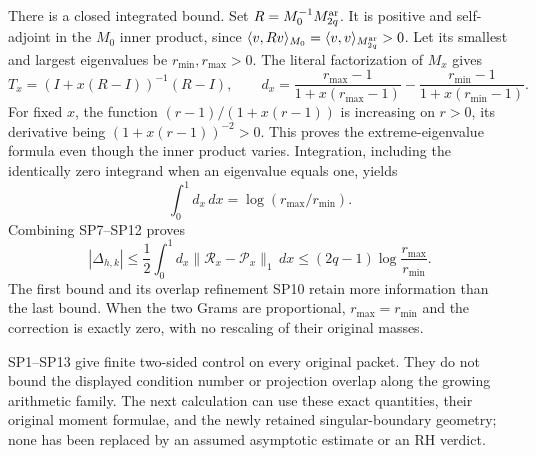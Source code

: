 There is a closed integrated bound. Set \(R=M_0^{-1}M^{\rm ar}_{2q}\).
It is positive and self-adjoint in the \(M_0\) inner product, since
\(\langle v,Rv\rangle_{M_0}=\langle v,v\rangle_{M^{\rm ar}_{2q}}>0\).
Let its smallest and largest eigenvalues be \(r_{\min},r_{\max}>0\).
The literal factorization of \(M_x\) gives
\[
 T_x=(I+x(R-I))^{-1}(R-I),\qquad
 d_x=\frac{r_{\max}-1}{1+x(r_{\max}-1)}
           -\frac{r_{\min}-1}{1+x(r_{\min}-1)} .
 \tag{SP11}
\]
For fixed \(x\), the function \((r-1)/(1+x(r-1))\) is increasing
on \(r>0\), its derivative being \((1+x(r-1))^{-2}>0\).
This proves the extreme-eigenvalue formula even though the inner
product varies. Integration, including the identically zero
integrand when an eigenvalue equals one, yields
\[
       \int_0^1d_x\,dx=\log(r_{\max}/r_{\min}).
 \tag{SP12}
\]
Combining SP7--SP12 proves
\[
 \boxed{
 |\Delta_{h,k}|
 \leq\frac12\int_0^1d_x
          \|\mathcal R_x-\mathcal P_x\|_1\,dx
 \leq(2q-1)\log\frac{r_{\max}}{r_{\min}} .}
 \tag{SP13}
\]
The first bound and its overlap refinement SP10 retain more
information than the last bound. When the two Grams are proportional,
\(r_{\max}=r_{\min}\) and the correction is exactly zero, with no
rescaling of their original masses.

SP1--SP13 give finite two-sided control on every original packet.
They do not bound the displayed condition number or projection
overlap along the growing arithmetic family. The next calculation
can use these exact quantities, their original moment formulae,
and the newly retained singular-boundary geometry; none has been
replaced by an assumed asymptotic estimate or an RH verdict.
